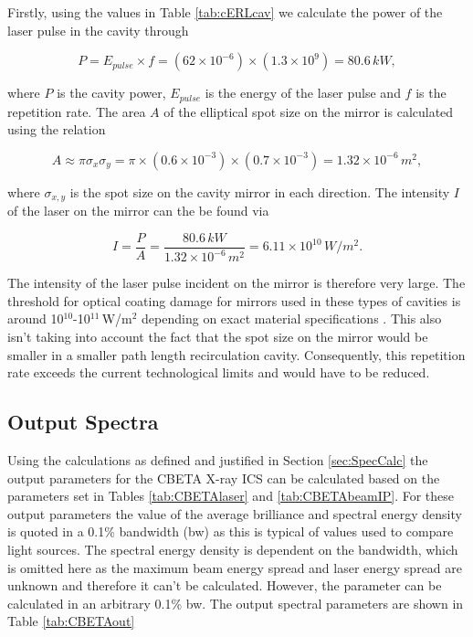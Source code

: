 \documentclass[11pt]{article}
\begin{document}
Firstly, using the values in Table \ref{tab:cERLcav} we calculate the power of the laser pulse in the cavity through

\begin{equation}
P = E_{pulse} \times f = \left(62 \times 10^{-6}\right) \times \left(1.3 \times 10^{9}\right) = 80.6\,kW,
\label{eq:cavpow}
\end{equation}
 
\noindent where $P$ is the cavity power, $E_{pulse}$ is the energy of the laser pulse and $f$ is the repetition rate. The area $A$ of the elliptical spot size on the mirror is calculated using the relation 
 
\begin{equation}
A \approx \pi\sigma_{x}\sigma_{y} = \pi \times \left(0.6\times 10^{-3}\right) \times \left(0.7 \times 10^{-3}\right) = 1.32\times 10^{-6}\,m^{2},
\label{eq:elipspot}
\end{equation}

\noindent where $\sigma_{x,y}$ is the spot size on the cavity mirror in each direction. The intensity $I$ of the laser on the mirror can the be found via

\begin{equation}
I = \frac{P}{A} = \frac{80.6\,kW}{1.32\times 10^{-6}\,m^{2}} = 6.11\times 10^{10}\,W/m^{2}.
\label{eq:cavIntensity}
\end{equation}

\noindent The intensity of the laser pulse incident on the mirror is therefore very large. The threshold for optical coating damage for mirrors used in these types of cavities is around 10$^{10}$-10$^{11}$\,W/m$^{2}$ depending on exact material specifications \cite{FZomercav}. This also isn't taking into account the fact that the spot size on the mirror would be smaller in a smaller path length recirculation cavity. Consequently, this repetition rate exceeds the current technological limits and would have to be reduced.  
 
\subsection{Output Spectra}

Using the calculations as defined and justified in Section \ref{sec:SpecCalc} the output parameters for the CBETA X-ray ICS can be calculated based on the parameters set in Tables \ref{tab:CBETAlaser} and \ref{tab:CBETAbeamIP}. For these output parameters the value of the average brilliance and spectral energy density is quoted in a 0.1\% bandwidth (bw) as this is typical of values used to compare light sources. The spectral energy density is dependent on the bandwidth, which is omitted here as the maximum beam energy spread and laser energy spread are unknown and therefore it can't be calculated. However, the parameter can be calculated in an arbitrary 0.1\% bw. The output spectral parameters are shown in Table \ref{tab:CBETAout}
\end{document}
